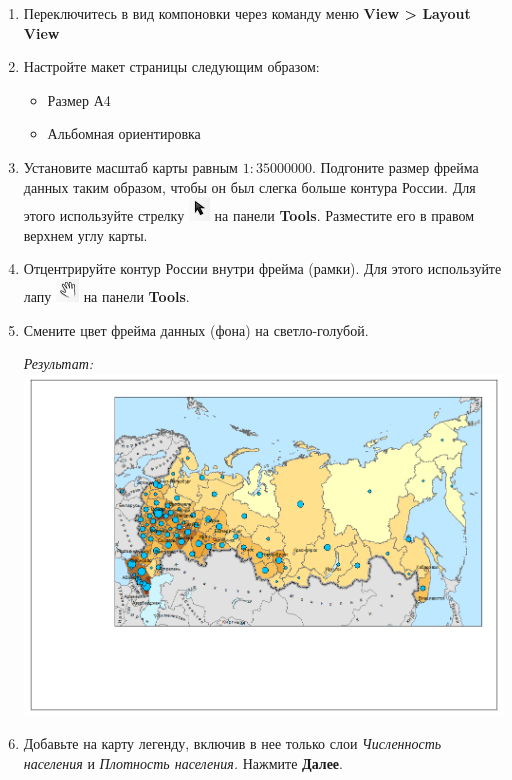 \documentclass[12pt,]{book}
\providecommand{\tightlist}{%
  \setlength{\itemsep}{0pt}\setlength{\parskip}{0pt}}
\begin{document}
\begin{enumerate}
\def\labelenumi{\arabic{enumi}.}
\item
  Переключитесь в вид компоновки через команду меню \textbf{View \textgreater{} Layout View}
\item
  Настройте макет страницы следующим образом:

  \begin{itemize}
  \tightlist
  \item
    Размер А4
  \item
    Альбомная ориентировка
  \end{itemize}
\item
  Установите масштаб карты равным \(1:35 000 000\). Подгоните размер фрейма данных таким образом, чтобы он был слегка больше контура России. Для этого используйте стрелку \includegraphics{images/Ex04/image29.png} на панели \textbf{Tools}. Разместите его в правом верхнем углу карты.
\item
  Отцентрируйте контур России внутри фрейма (рамки). Для этого используйте лапу \includegraphics{images/Ex04/image30.png} на панели \textbf{Tools}.
\item
  Смените цвет фрейма данных (фона) на светло-голубой.

  \emph{Результат:}
  \includegraphics{images/Ex04/image31.png}
\item
  Добавьте на карту легенду, включив в нее только слои \emph{Численность населения} и \emph{Плотность населения.} Нажмите \textbf{Далее}.


\end{enumerate}
\end{document}
